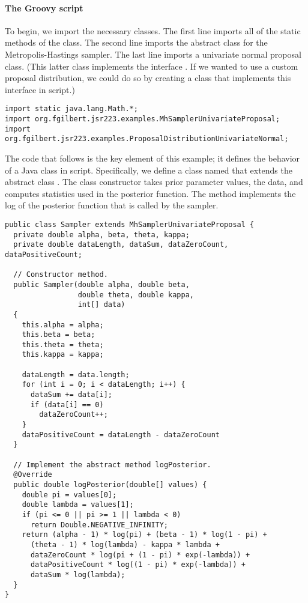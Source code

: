 \paragraph{The Groovy script} To begin, we import the necessary classes. The first line imports all of the static methods of the  class. The second line imports the abstract class for the Metropolis-Hastings sampler. The last line imports a univariate normal proposal class. (This latter class implements the interface . If we wanted to use a custom proposal distribution, we could do so by creating a class that implements this interface in script.)

\begin{verbatim}
import static java.lang.Math.*;
import org.fgilbert.jsr223.examples.MhSamplerUnivariateProposal;
import org.fgilbert.jsr223.examples.ProposalDistributionUnivariateNormal;
\end{verbatim}

The code that follows is the key element of this example; it defines the behavior of a Java class in script. Specifically, we define a class named  that extends the abstract class . The class constructor takes prior parameter values, the data, and computes statistics used in the posterior function. The  method implements the log of the posterior function that is called by the sampler.

\begin{verbatim}
public class Sampler extends MhSamplerUnivariateProposal {
  private double alpha, beta, theta, kappa;
  private double dataLength, dataSum, dataZeroCount, dataPositiveCount;

  // Constructor method.
  public Sampler(double alpha, double beta,
                 double theta, double kappa,
                 int[] data)
  {
    this.alpha = alpha;
    this.beta = beta;
    this.theta = theta;
    this.kappa = kappa;

    dataLength = data.length;
    for (int i = 0; i < dataLength; i++) {
      dataSum += data[i];
      if (data[i] == 0)
        dataZeroCount++;
    }
    dataPositiveCount = dataLength - dataZeroCount
  }

  // Implement the abstract method logPosterior.
  @Override
  public double logPosterior(double[] values) {
    double pi = values[0];
    double lambda = values[1];
    if (pi <= 0 || pi >= 1 || lambda < 0)
      return Double.NEGATIVE_INFINITY;
    return (alpha - 1) * log(pi) + (beta - 1) * log(1 - pi) +
      (theta - 1) * log(lambda) - kappa * lambda +
      dataZeroCount * log(pi + (1 - pi) * exp(-lambda)) +
      dataPositiveCount * log((1 - pi) * exp(-lambda)) +
      dataSum * log(lambda);
  }
}
\end{verbatim}

